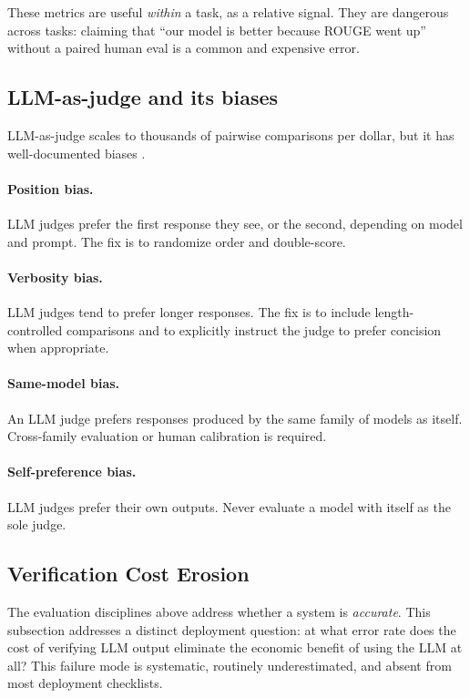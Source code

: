 These metrics are useful \emph{within} a task, as a relative
signal. They are dangerous across tasks: claiming that ``our
model is better because ROUGE went up'' without a paired human
eval is a common and expensive error.

\subsection{LLM-as-judge and its biases}
\label{sec:wk10_llm_judge}

LLM-as-judge scales to thousands of pairwise comparisons per
dollar, but it has well-documented biases \citep{zheng2023llmjudge}.

\paragraph{Position bias.} LLM judges prefer the first response
they see, or the second, depending on model and prompt. The fix
is to randomize order and double-score.

\paragraph{Verbosity bias.} LLM judges tend to prefer longer
responses. The fix is to include length-controlled comparisons
and to explicitly instruct the judge to prefer concision when
appropriate.

\paragraph{Same-model bias.} An LLM judge prefers responses
produced by the same family of models as itself. Cross-family
evaluation or human calibration is required.

\paragraph{Self-preference bias.} LLM judges prefer their own
outputs. Never evaluate a model with itself as the sole judge.

\subsection{Verification Cost Erosion}
\label{sec:verification-cost-erosion}

The evaluation disciplines above address whether a system is
\emph{accurate}. This subsection addresses a distinct deployment
question: at what error rate does the cost of verifying LLM
output eliminate the economic benefit of using the LLM at all?
This failure mode is systematic, routinely underestimated, and
absent from most deployment checklists.

